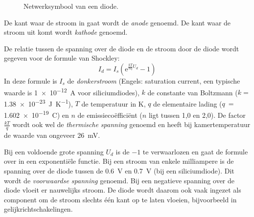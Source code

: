 \begin{figure}[!ht]
\centering
{}
\caption{Netwerksymbool van een diode.}
\label{fig:gelsymbooldiode}
\end{figure}

De kant waar de stroom in gaat wordt de \textsl{anode} genoemd. De kant waar de stroom uit komt wordt \textsl{kathode} genoemd.

De relatie tussen de spanning over de diode en de stroom door de diode wordt gegeven voor de formule van Shockley:
%
\begin{equation}
I_d = I_s \left(\mathrm{e}^{\frac{kT}{nq}U_d}-1\right)
\end{equation}
%
In deze formule is $I_s$ de \textsl{donkerstroom} (Engels: saturation current, een typische waarde is \SI{1e-12}{\ampere} voor siliciumdiodes), $k$ de constante van Boltzmann ($k = $ \SI{1.38e-23}{\joule\per\kelvin}), $T$ de temperatuur in \si{\kelvin}, $q$ de elementaire lading ($q~=~$\SI{1.602e-19}{\coulomb}) en $n$ de emissieco\"effici\"ent ($n$ ligt tussen 1,0 en 2,0). De factor $\frac{kT}{q}$ wordt ook wel de \textsl{thermische spanning} genoemd en heeft bij kamertemperatuur de waarde van ongeveer \SI{26}{\milli\volt}.

Bij een voldoende grote spanning $U_d$ is de $-1$ te verwaarlozen en gaat de formule over in een exponenti\"ele functie. Bij een stroom van enkele milliampere is de spanning over de diode tussen de \SI{0.6}{\volt} en \SI{0.7}{\volt} (bij een siliciumdiode). Dit wordt de \textsl{voorwaardse spanning} genoemd. Bij een negatieve spanning over de diode vloeit er nauwelijks stroom. De diode wordt daarom ook vaak ingezet als component om de stroom slechts \'e\'en kant op te laten vloeien, bijvoorbeeld in gelijkrichtschakelingen.


